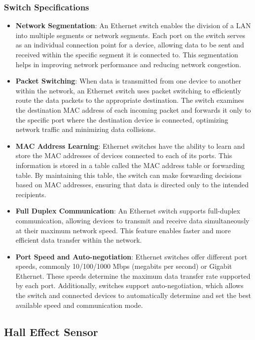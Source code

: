 \documentclass[
12pt,
oneside, 
onehalfspacing, 
nolistspacing, 
parskip, 
chapterinoneline, 
]{AASTCOMPUTER}
\begin{document}
\subsubsection{Switch Specifications}
\begin{itemize}
    \item \textbf{Network Segmentation}: An Ethernet switch enables the division of a LAN into multiple segments or network segments. Each port on the switch serves as an individual connection point for a device, allowing data to be sent and received within the specific segment it is connected to. This segmentation helps in improving network performance and reducing network congestion.
    \item \textbf{Packet Switching}: When data is transmitted from one device to another within the network, an Ethernet switch uses packet switching to efficiently route the data packets to the appropriate destination. The switch examines the destination MAC address of each incoming packet and forwards it only to the specific port where the destination device is connected, optimizing network traffic and minimizing data collisions.
    \item \textbf{MAC Address Learning}: Ethernet switches have the ability to learn and store the MAC addresses of devices connected to each of its ports. This information is stored in a table called the MAC address table or forwarding table. By maintaining this table, the switch can make forwarding decisions based on MAC addresses, ensuring that data is directed only to the intended recipients.
    \item \textbf{Full Duplex Communication}: An Ethernet switch supports full-duplex communication, allowing devices to transmit and receive data simultaneously at their maximum network speed. This feature enables faster and more efficient data transfer within the network.
    \item \textbf{Port Speed and Auto-negotiation}: Ethernet switches offer different port speeds, commonly 10/100/1000 Mbps (megabits per second) or Gigabit Ethernet. These speeds determine the maximum data transfer rate supported by each port. Additionally, switches support auto-negotiation, which allows the switch and connected devices to automatically determine and set the best available speed and communication mode.
\end{itemize}
\subsection{Hall Effect Sensor}
\end{document}
